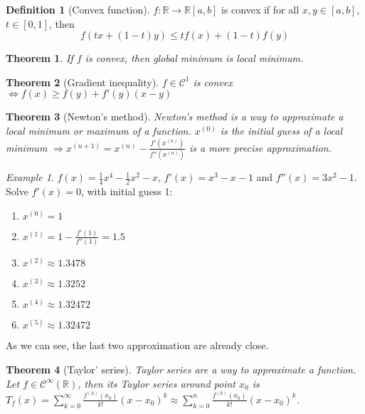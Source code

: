 \documentclass{article}
\newcommand{\DS}{\displaystyle}
\newcommand{\Ar}{\Rightarrow}
\newenvironment{enumarabic}{\begin{enumerate}[label=(\arabic*)]}{\end{enumerate}}
\newcommand{\fOnR}[1]{#1 : \mathbb{R} \rightarrow \mathbb{R}}
\newcommand{\intcc}[1]{\left[#1\right]}
\theoremstyle{definition}
\newtheorem{definition}{Definition}[section]
\theoremstyle{definition}
\theoremstyle{plain}
\newtheorem{theorem}{Theorem}[section]
\theoremstyle{plain}
\theoremstyle{plain}
\theoremstyle{plain}
\theoremstyle{definition}
\theoremstyle{remark}
\theoremstyle{remark}
\theoremstyle{remark}
\newtheorem{examplet}{Example}[theorem]
\theoremstyle{remark}
\newcommand{\R}{\mathbb{R}}
\newcommand{\C}{\mathcal{C}}
\begin{document}
\begin{definition}[Convex function]
  $\fOnR{f}{\intcc{a,b}}$ is convex if for all $x,y \in \intcc{a,b}$, $t \in \intcc{0,1}$, then
  \[
  f(tx+(1-t)y) \leq tf(x) + (1-t)f(y)
  \]
\end{definition}


\begin{theorem}
  If $f$ is convex, then global minimum is local minimum.
\end{theorem}



\begin{theorem}[Gradient inequality]
  $f \in \C^1$ is convex $\iff f(x) \geq f(y) + f'(y)(x-y)$
\end{theorem}



\begin{theorem}[Newton's method]
  Newton's method is a way to approximate a local minimum or maximum of a function. $x^{(0)}$ is the initial guess of a local minimum $\Ar x^{(n+1)} = x^{(n)} - \frac{f'(x^{(n)})}{f''(x^{(n)})}$ is a more precise approximation.
\end{theorem}


\begin{examplet}
  $f(x) = \frac{1}{4}x^4 - \frac{1}{2}x^2 - x$, $f'(x) = x^3 - x - 1$ and $f''(x) = 3x^2 - 1$. Solve $f'(x) = 0$, with initial guess 1:
  \begin{enumarabic}
  \item $x^{(0)} = 1$
  \item $x^{(1)} = 1 - \frac{f'(1)}{f''(1)} = 1.5$
  \item $x^{(2)} \approx 1.3478$
  \item $x^{(3)} \approx 1.3252$
  \item $x^{(4)} \approx 1.32472$
  \item $x^{(5)} \approx 1.32472$
  \end{enumarabic}
  As we can see, the last two approximation are already close.
\end{examplet}


\begin{theorem}[Taylor' series]
  Taylor series are a way to approximate a function. Let $f \in \C^\infty(\R)$, then its Taylor series around point $x_0$ is $\DS T_f(x) = \sum_{k=0}^\infty \frac{f^{(k)}(x_0)}{k!}(x-x_0)^k \approx \sum_{k=0}^n \frac{f^{(k)}(x_0)}{k!}(x-x_0)^k$.
\end{theorem}
\end{document}
